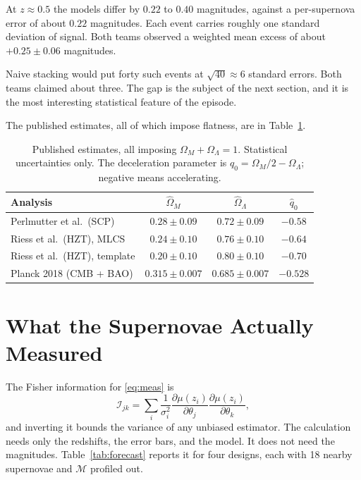 \documentclass[11pt]{article}
\begin{document}
At $z \approx 0.5$ the models differ by $0.22$ to $0.40$ magnitudes, against a
per-supernova error of about $0.22$ magnitudes.  Each event carries roughly
one standard deviation of signal.  Both teams observed a weighted mean excess
of about $+0.25 \pm 0.06$ magnitudes.

Naive stacking would put forty such events at $\sqrt{40} \approx 6$ standard
errors.  Both teams claimed about three.  The gap is the subject of the next
section, and it is the most interesting statistical feature of the episode.

The published estimates, all of which impose flatness, are in
Table~\ref{tab:results}.

\begin{table}[ht]
\centering
\caption{Published estimates, all imposing $\Omega_M + \Omega_\Lambda = 1$.
Statistical uncertainties only.  The deceleration parameter is
$q_0 = \Omega_M/2 - \Omega_\Lambda$; negative means accelerating.}
\label{tab:results}
\medskip
\begin{tabular}{lccc}
\toprule
Analysis & $\hat\Omega_M$ & $\hat\Omega_\Lambda$ & $\hat q_0$ \\
\midrule
Perlmutter et al.\ (SCP)          & $0.28\pm0.09$ & $0.72\pm0.09$ & $-0.58$ \\
Riess et al.\ (HZT), MLCS         & $0.24\pm0.10$ & $0.76\pm0.10$ & $-0.64$ \\
Riess et al.\ (HZT), template     & $0.20\pm0.10$ & $0.80\pm0.10$ & $-0.70$ \\
\midrule
Planck 2018 (CMB + BAO)           & $0.315\pm0.007$ & $0.685\pm0.007$ & $-0.528$ \\
\bottomrule
\end{tabular}
\end{table}

\section{What the Supernovae Actually Measured}
\label{sec:fisher}

The Fisher information for \eqref{eq:meas} is
\begin{equation}\label{eq:fisher}
  \mathcal{I}_{jk} = \sum_i \frac{1}{\sigma_i^2}
  \frac{\partial\mu(z_i)}{\partial\theta_j}
  \frac{\partial\mu(z_i)}{\partial\theta_k},
\end{equation}
and inverting it bounds the variance of any unbiased estimator.  The
calculation needs only the redshifts, the error bars, and the model.  It does
not need the magnitudes.  Table~\ref{tab:forecast} reports it for four
designs, each with 18 nearby supernovae and $\mathcal{M}$ profiled out.
\end{document}
